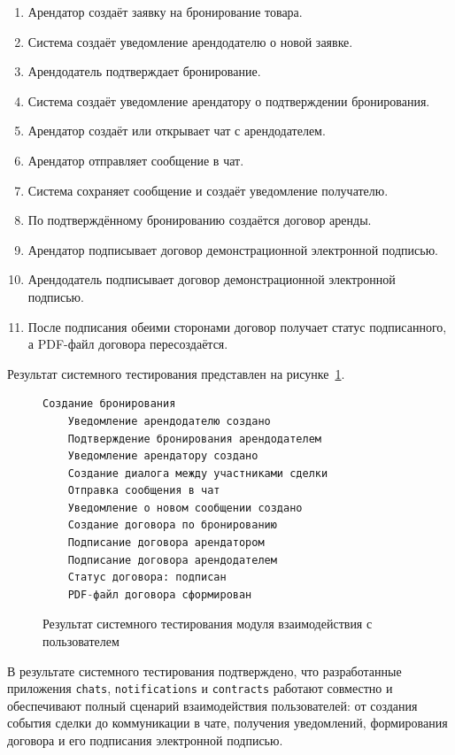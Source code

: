 \begin{enumerate}
    \item Арендатор создаёт заявку на бронирование товара.
    \item Система создаёт уведомление арендодателю о новой заявке.
    \item Арендодатель подтверждает бронирование.
    \item Система создаёт уведомление арендатору о подтверждении бронирования.
    \item Арендатор создаёт или открывает чат с арендодателем.
    \item Арендатор отправляет сообщение в чат.
    \item Система сохраняет сообщение и создаёт уведомление получателю.
    \item По подтверждённому бронированию создаётся договор аренды.
    \item Арендатор подписывает договор демонстрационной электронной подписью.
    \item Арендодатель подписывает договор демонстрационной электронной подписью.
    \item После подписания обеими сторонами договор получает статус подписанного, а PDF-файл договора пересоздаётся.
\end{enumerate}

Результат системного тестирования представлен на рисунке~\ref{fig:system_tests_result}.

\begin{figure}[H]
\begin{lstlisting}[language=Python]
	Создание бронирования
	Уведомление арендодателю создано
	Подтверждение бронирования арендодателем
	Уведомление арендатору создано
	Создание диалога между участниками сделки
	Отправка сообщения в чат
	Уведомление о новом сообщении создано
	Cоздание договора по бронированию
	Подписание договора арендатором
	Подписание договора арендодателем
	Статус договора: подписан
	PDF-файл договора сформирован
\end{lstlisting}
\caption{Результат системного тестирования модуля взаимодействия с пользователем}
\label{fig:system_tests_result}
\end{figure}

В результате системного тестирования подтверждено, что разработанные приложения \texttt{chats}, \texttt{notifications} и \texttt{contracts} работают совместно и обеспечивают полный сценарий взаимодействия пользователей: от создания события сделки до коммуникации в чате, получения уведомлений, формирования договора и его подписания электронной подписью.